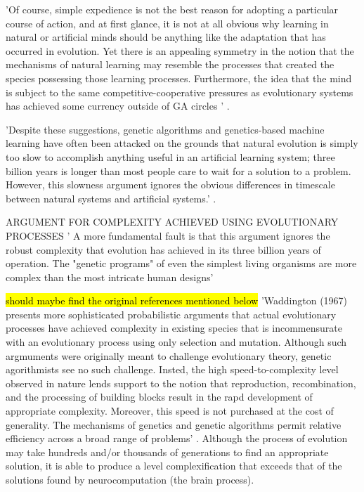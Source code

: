 'Of course, simple expedience is not the best reason for adopting a particular course of action, and at first glance, it is not at all obvious why learning in natural or artificial minds should be anything like the adaptation that has occurred in evolution. Yet there is an appealing symmetry in the notion that the mechanisms of natural learning may resemble the processes that created the species possessing those learning processes. Furthermore, the idea that the mind is subject to the same competitive-cooperative pressures as evolutionary systems has achieved some currency outside of GA circles ' \cite{goldberg1988genetic}.

'Despite these suggestions, genetic algorithms and genetics-based machine learning have often been attacked on the grounds that natural evolution is simply too slow to accomplish anything useful in an artificial learning system; three billion years is longer than most people care to wait for a solution to a problem. However, this slowness argument ignores the obvious differences in timescale between natural systems and artificial systems.' \cite{goldberg1988genetic}.

ARGUMENT FOR COMPLEXITY ACHIEVED USING EVOLUTIONARY PROCESSES
' A more fundamental fault is that this argument ignores the robust complexity that evolution has achieved in its three billion years of operation. The "genetic programs" of even the simplest living organisms are more complex than the most intricate human designs' \cite{goldberg1988genetic}

\hl{should maybe find the original references mentioned below}
'Waddington (1967) presents more sophisticated probabilistic arguments that actual evolutionary processes have achieved complexity in existing species that is incommensurate with an evolutionary process using only selection and mutation. Although such argmuments were originally meant to challenge evolutionary theory, genetic agorithmists see no such challenge. Insted, the high speed-to-complexity level observed in nature lends support to the notion that reproduction, recombination, and the processing of building blocks result in the rapd development of appropriate complexity. Moreover, this speed is not purchased at the cost of generality. The mechanisms of genetics and genetic algorithms permit relative efficiency across a broad range of problems' \cite{goldberg1988genetic}.
Although the process of evolution may take hundreds and/or thousands of generations to find an appropriate solution, it is able to produce a level complexification that exceeds that of the solutions found by neurocomputation (the brain process).








